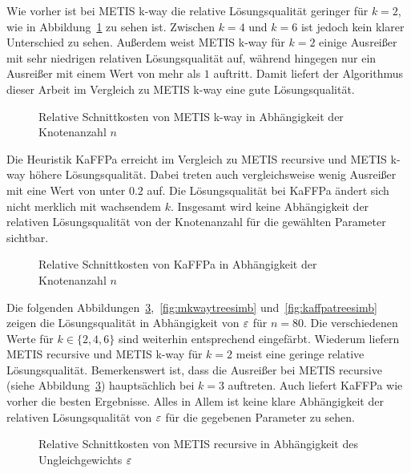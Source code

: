 Wie vorher ist bei METIS k-way die relative Lösungsqualität geringer für $k=2$, wie in Abbildung~\ref{fig:mkwaytreesnodes} zu sehen ist.
Zwischen $k=4$ und $k=6$ ist jedoch kein klarer Unterschied zu sehen.
Außerdem weist METIS k-way für $k=2$ einige Ausreißer mit sehr niedrigen relativen Lösungsqualität auf, während hingegen nur ein Ausreißer mit einem Wert von mehr als $1$ auftritt.
Damit liefert der Algorithmus dieser Arbeit im Vergleich zu METIS k-way eine gute Lösungsqualität.

\begin{figure}[H]
    \centering
    
    \caption{Relative Schnittkosten von METIS k-way in Abhängigkeit der Knotenanzahl $n$\label{fig:mkwaytreesnodes}}
\end{figure}

Die Heuristik KaFFPa erreicht im Vergleich zu METIS recursive und METIS k-way höhere Lösungsqualität.
Dabei treten auch vergleichsweise wenig Ausreißer mit eine Wert von unter $0.2$ auf.
Die Lösungsqualität bei KaFFPa ändert sich nicht merklich mit wachsendem $k$.
Insgesamt wird keine Abhängigkeit der relativen Lösungsqualität von der Knotenanzahl für die gewählten Parameter sichtbar.

\begin{figure}[H]
    \centering
    
    \caption{Relative Schnittkosten von KaFFPa in Abhängigkeit der Knotenanzahl $n$\label{fig:kaffpatreesnodes}}
\end{figure}

Die folgenden Abbildungen~\ref{fig:mrectreesimb},~\ref{fig:mkwaytreesimb} und~\ref{fig:kaffpatreesimb} zeigen die Lösungsqualität in Abhängigkeit von $\varepsilon$ für $n=80$.
Die verschiedenen Werte für $k \in \{2,4,6\}$ sind weiterhin entsprechend eingefärbt.
Wiederum liefern METIS recursive und METIS k-way für $k=2$ meist eine geringe relative Lösungsqualität.
Bemerkenswert ist, dass die Ausreißer bei METIS recursive (siehe Abbildung~\ref{fig:mrectreesimb}) hauptsächlich bei $k=3$ auftreten.
Auch liefert KaFFPa wie vorher die besten Ergebnisse.
Alles in Allem ist keine klare Abhängigkeit der relativen Lösungsqualität von $\varepsilon$ für die gegebenen Parameter zu sehen.

\begin{figure}[H]
    \centering
    
    \caption{Relative Schnittkosten von METIS recursive in Abhängigkeit des Ungleichgewichts $\varepsilon$\label{fig:mrectreesimb}}
\end{figure}

